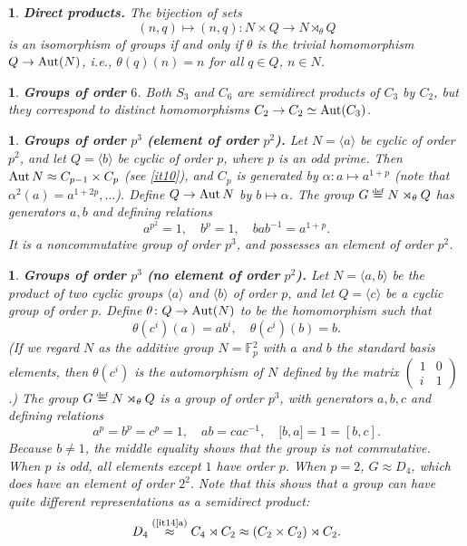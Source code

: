 \documentclass[a4paper,11pt,final,openany]{memoir}%
\newtheorem{plain}[X]{}
\theoremstyle{nonumberplain}
\begin{document}
\begin{plain}
\label{it16b}\textbf{Direct products. }The bijection of sets
\[
(n,q)\mapsto(n,q)\colon N\times Q\rightarrow N\rtimes_{\theta}Q
\]
is an isomorphism of groups if and only if $\theta$ is the trivial
homomorphism $Q\rightarrow\operatorname{Aut}(N)$, i.e., $\theta(q)(n)=n$ for all $q\in Q$,
$n\in N$.
\end{plain}

\begin{plain}
\label{it16c}\textbf{Groups of order }$6$. Both $S_{3}$ and $C_{6}$ are
semidirect products of $C_{3}$ by $C_{2}$, but they correspond to distinct
homomorphisms $C_{2}\rightarrow C_{2}\simeq\operatorname{Aut}(C_{3})$.
\end{plain}

\begin{plain}
\label{it16e}\textbf{Groups of order }$p^{3}$ \textbf{(element of order
}$p^{2}$\textbf{). }Let $N=\langle a\rangle$ be cyclic of order $p^{2}$, and
let $Q=\langle b\rangle$ be cyclic of order $p$, where $p$ is an odd prime.
Then $\operatorname{Aut} N\approx C_{p-1}\times C_{p}$ (see \ref{it10}), and $C_{p}$ is
generated by $\alpha\colon a\mapsto a^{1+p}$ (note that $\alpha^{2}%
(a)=a^{1+2p},\ldots$). Define $Q\rightarrow\operatorname{Aut} N$ by $b\mapsto\alpha$. The
group $G\overset{\df}{=}N\rtimes_{\theta}Q$ has generators
$a,b$ and defining relations
\[
a^{p^{2}}=1,\quad b^{p}=1,\quad bab^{-1}=a^{1+p}.
\]
It is a noncommutative group of order $p^{3}$, and possesses an element of
order $p^{2}$.
\end{plain}

\begin{plain}
\label{it16d}\textbf{Groups of order }$p^{3}$ \textbf{(no element of order
}$p^{2}$\textbf{). }Let $N=\langle a,b\rangle$ be the product of two cyclic
groups $\langle a\rangle$ and $\langle b\rangle$ of order $p$, and let
$Q=\langle c\rangle$ be a cyclic group of order $p$. Define $\theta\colon
Q\rightarrow\operatorname{Aut}(N)$ to be the homomorphism such that%
\[
\theta(c^{i})(a)=ab^{i},\quad\theta(c^{i})(b)=b\text{.}%
\]
(If we regard $N$ as the additive group $N=\mathbb{F}{}_{p}^{2}$ with $a$ and
$b$ the standard basis elements, then $\theta(c^{i})$ is the automorphism of
$N$ defined by the matrix $%
\begin{pmatrix}
1 & 0\\
i & 1
\end{pmatrix}
$.) The group $G\overset{\df}{=}N\rtimes_{\theta}Q$ is a group
of order $p^{3}$, with generators $a,b,c$ and defining relations
\[
a^{p}=b^{p}=c^{p}=1,\quad ab=cac^{-1},\quad\lbrack b,a]=1=[b,c].
\]
Because $b\neq1$, the middle equality shows that the group is not commutative.
When $p$ is odd, all elements except $1$ have order $p$. When $p=2$, $G\approx
D_{4}$, which does have an element of order $2^{2}.$ Note that this shows that
a group can have quite different representations as a semidirect product:
\[
D_{4}\overset{(\text{\ref{it14}a)}}{\approx}C_{4}\rtimes C_{2}\approx
(C_{2}\times C_{2})\rtimes C_{2}.
\]

\end{plain}
\end{document}
